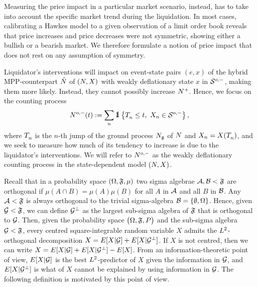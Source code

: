 \documentclass[10pt, article,table]{article}
\begin{document}
Measuring the price impact in a particular market scenario, instead, has to take into account the specific market trend during the liquidation. In most cases, calibrating a Hawkes model to a given observation of a limit order book reveals that price increases and price decreases were not symmetric, showing either a bullish or a bearish market. We therefore formulate a notion of price impact that does not rest on any assumption of symmetry. 

Liquidator's interventions will impact on event-state pairs $(e,x)$ of the hybrid MPP-counterpart $\hybridHawkes$ of $\sdHawkesPair$ with weakly deflationary state $x$ in $\weakDeflSpace$, making them more likely. Instead, they cannot possibly increase $\Nplus$. Hence, we focus on the counting process 
\begin{equation}\label{eq.weakly_deflationary_coutning_process}
 \weakDeflPP (t) : = \sum_{n}\one\left\lbrace
 \arrivalTimes[]_n \leq t, \, \, \stateVariable_n \in \weakDeflSpace
 \right\rbrace,
\end{equation}
where $\arrivalTimes[]_n$ is the $n$-th jump of the ground process $\groundProc$ of $\multiCountingProc$ and $\stateVariable_n = \stateVariable(\arrivalTimes[]_n)$, and we seek to measure how much of its tendency to increase is due to the liquidator's interventions. We will refer to $\weakDeflPP$ as the weakly deflationary counting process in the state-dependent model $\sdHawkesPair$.

Recall that in a probability space $(\Omega,\sigmaAlgebra,\mu)$ two sigma algebrae $\setAlgebraA, \setAlgebraB < \sigmaAlgebra$ are orthogonal if $\mu(A\cap B)=\mu(A)\mu(B)$ for all $A$ in $\setAlgebraA$ and all $B$ in $\setAlgebraB$. Any $\setAlgebraA < \sigmaAlgebra$ is always orthogonal to the trivial sigma-algebra $\setAlgebraB = \lbrace \emptyset, \Omega\rbrace$. Hence, given $\sigmaAlgebraG < \sigmaAlgebra$, we can define
$\sigmaAlgebraG\orthogonal$ as the largest sub-sigma algebra of $\sigmaAlgebra$ that is orthogonal to $\sigmaAlgebraG$. Then, given the probability space $\probabilitySpace$ and the sub-sigma algebra $\sigmaAlgebraG < \sigmaAlgebra$, every centred square-integrable random variable $X$ admits the $\Ltwo$-orthogonal decomposition $X = \Expectation[X\vert \sigmaAlgebraG] + \Expectation[X\vert\sigmaAlgebraG\orthogonal]$.
If $X$ is not centred, then we can write $X = \Expectation[X\vert \sigmaAlgebraG] + \Expectation[X\vert\sigmaAlgebraG\orthogonal] - \Expectation[X]$.
From an information-theoretic point of view, $\Expectation[X\vert\sigmaAlgebraG]$ is the best $\Ltwo$-predictor of $X$ given the information in $\sigmaAlgebraG$, and $\Expectation[X\vert\sigmaAlgebraG\orthogonal]$ is what of $X$ cannot be explained by using information in $\sigmaAlgebraG$. The following definition is motivated by this point of view. 
\end{document}
